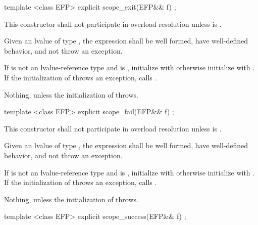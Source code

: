 \documentclass[ebook,11pt,article]{memoir}
\begin{document}
\begin{itemdecl}
template <class EFP>
explicit
scope_exit(EFP&& f) ;
\end{itemdecl}

\begin{itemdescr}

\pnum
\remarks This constructor shall not participate in overload resolution unless  is .

\pnum
\requires Given an lvalue  of type , the expression  shall be well formed, have well-defined behavior, and not throw an exception.


\pnum
\effects If  is not an lvalue-reference type and  is , initialize   with  otherwise initialize  with . 
If the initialization of  throws an exception, calls .

\pnum
\throws Nothing, unless the initialization of  throws.
\end{itemdescr}


\begin{itemdecl}
template <class EFP>
explicit
scope_fail(EFP&& f) ;
\end{itemdecl}

\begin{itemdescr}
\pnum
\remarks This constructor shall not participate in overload resolution unless  is .

\pnum
\requires Given an lvalue  of type , the expression  shall be well formed, have well-defined behavior, and not throw an exception.

\pnum
\effects If  is not an lvalue-reference type and  is , initialize   with  otherwise initialize  with . If the initialization of  throws an exception, calls .

\pnum
\throws Nothing, unless the initialization of  throws.

\end{itemdescr}

\begin{itemdecl}
template <class EFP>
explicit
scope_success(EFP&& f) ;
\end{itemdecl}
\end{document}
